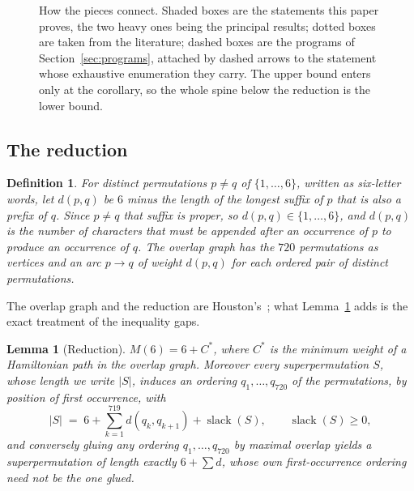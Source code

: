 \documentclass[10pt]{article}
\newtheorem{lemma}[theorem]{Lemma}
\newtheorem{definition}[theorem]{Definition}
\theoremstyle{remark}
\theoremstyle{plain}
\newcommand{\slack}{\operatorname{slack}}
\begin{document}
\begin{figure}[H]
\caption{How the pieces connect.  Shaded boxes are the statements this
paper proves, the two heavy ones being the principal results;
dotted boxes are taken from the literature; dashed boxes are the
programs of Section~\ref{sec:programs}, attached by dashed arrows to
the statement whose exhaustive enumeration they carry.  The upper
bound enters only at the corollary, so the whole spine below the
reduction is the lower bound.}
\label{fig:map}
\end{figure}
\subsection{The reduction}


\begin{definition}\label{def:d}
For \emph{distinct} permutations $p\ne q$ of $\{1,\dots,6\}$, written
as six-letter words, let $d(p,q)$ be $6$ minus the length of the
longest suffix of $p$ that is also a prefix of $q$.  Since $p\ne q$
that suffix is proper, so $d(p,q)\in\{1,\dots,6\}$, and $d(p,q)$ is the
number of characters that must be appended after an occurrence of $p$
to produce an occurrence of $q$.  The \emph{overlap graph} has the
$720$ permutations as vertices and an arc $p\to q$ of weight $d(p,q)$
for each ordered pair of distinct permutations.
\end{definition}

The overlap graph and the reduction are Houston's~\cite[Section~2]{Houston14};
what Lemma~\ref{lem:reduction} adds is the exact treatment of the
inequality gaps.

\begin{lemma}[Reduction]\label{lem:reduction}
$M(6)=6+C^{*}$, where $C^{*}$ is the minimum weight of a Hamiltonian
path in the overlap graph.  Moreover every superpermutation $S$, whose
length we write $|S|$, induces an ordering $q_1,\dots,q_{720}$ of the
permutations, by position of first occurrence, with
\[
|S| \;=\; 6+\sum_{k=1}^{719} d(q_k,q_{k+1})+\slack(S),
\qquad \slack(S)\ge 0,
\]
and conversely gluing any ordering $q_1,\dots,q_{720}$ by maximal
overlap yields a superpermutation of length exactly $6+\sum d$, whose
own first-occurrence ordering need not be the one glued.
\end{lemma}
\end{document}
